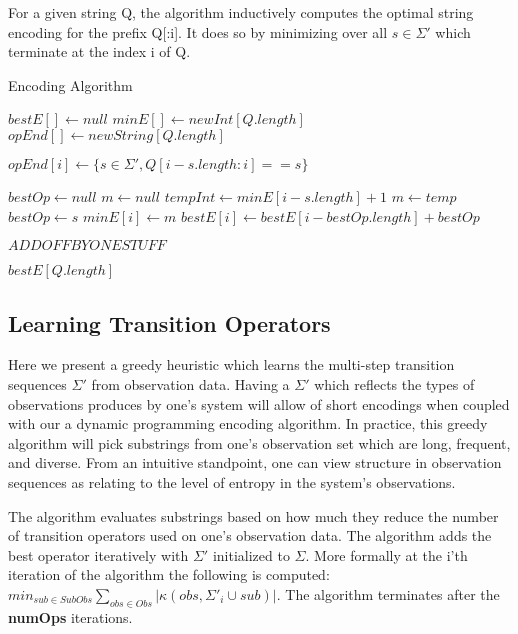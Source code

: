 For a given string Q, the algorithm inductively computes the optimal string encoding for the prefix Q[:i]. It does so by minimizing over all $s \in \Sigma'$ which terminate at the index i of Q.

\begin{algorithm}
\caption{Encoding Algorithm}
\label{Encoding Algorithm}
\begin{algorithmic}[1]

\State $bestE[] \gets null$
\State $minE[] \gets new Int[Q.length]$
\State $opEnd[] \gets new String[Q.length]$

	 \State $opEnd[i] \gets \{s \in \Sigma', Q[i-s.length:i] == s\}$
\EndFor

	\State $bestOp \gets null$
	\State $m \gets null$ 
		\State $tempInt \gets minE[i-s.length] + 1$
			\State $m \gets temp$ 
			\State $bestOp \gets s$
		\EndIf
	\EndFor
	\State $minE[i] \gets m$
	\State $bestE[i] \gets bestE[i-bestOp.length] + bestOp$
\EndFor

$ADD OFF BY ONE STUFF$

\Return $bestE[Q.length]$

\EndProcedure
\end{algorithmic}
\end{algorithm}

\subsection{Learning Transition Operators}

Here we present a greedy heuristic which learns the multi-step transition sequences $\Sigma'$ from observation data. Having a $\Sigma'$ which reflects the types of observations produces by one's system will allow of short encodings when coupled with our a dynamic programming encoding algorithm. In practice, this greedy algorithm will pick substrings from one's observation set which are long, frequent, and diverse. From an intuitive standpoint, one can view structure in observation sequences as relating to the level of entropy in the system's observations. 

The algorithm evaluates substrings based on how much they reduce the number of transition operators used on one's observation data. The algorithm adds the best operator iteratively with $\Sigma'$ initialized to $\Sigma$. More formally at the i'th iteration of the algorithm the following is computed: $min_{sub \in SubObs} \sum\nolimits_{obs \in Obs}|\kappa(obs,\Sigma'_i \cup sub)|$. The algorithm terminates after the \textbf{numOps} iterations. 

